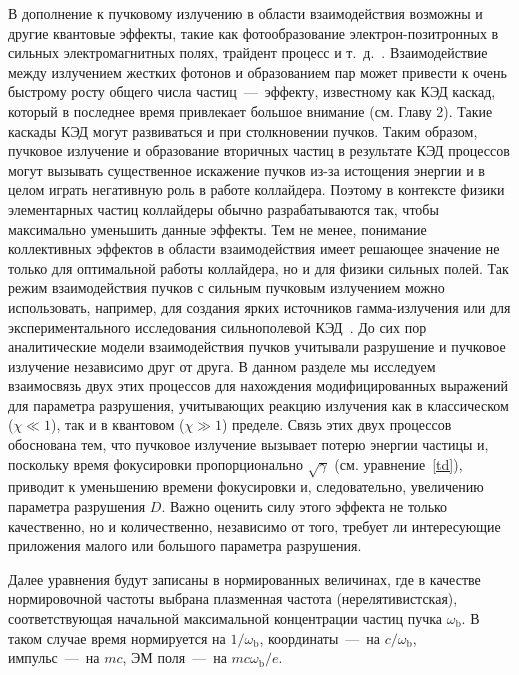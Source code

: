 В дополнение к пучковому излучению в области взаимодействия возможны и другие квантовые эффекты, такие как фотообразование электрон-позитронных в сильных электромагнитных полях, трайдент процесс и т. д.~\cite{chen1989coherent,hartin2018strong}.
Взаимодействие между излучением жестких фотонов и образованием пар может привести к очень быстрому росту общего числа частиц~---~эффекту, известному как КЭД каскад, который в последнее время привлекает большое внимание (см. Главу 2).
Такие каскады КЭД могут развиваться и при столкновении пучков.
Таким образом, пучковое излучение и образование вторичных частиц в результате КЭД процессов могут вызывать существенное искажение пучков из-за истощения энергии и в целом играть негативную роль в работе коллайдера.
Поэтому в контексте физики элементарных частиц коллайдеры обычно разрабатываются так, чтобы максимально уменьшить данные эффекты.
Тем не менее, понимание коллективных эффектов в области взаимодействия имеет решающее значение не только для оптимальной работы коллайдера, но и для физики сильных полей.
Так режим взаимодействия пучков с сильным пучковым излучением можно использовать, например, для создания ярких источников гамма-излучения или для экспериментального исследования сильнополевой КЭД~\cite{del2019bright,song2021generation,tamburini2020efficient}.
До сих пор аналитические модели взаимодействия пучков учитывали разрушение и пучковое излучение независимо друг от друга.
В данном разделе мы исследуем взаимосвязь двух этих процессов для нахождения модифицированных выражений для параметра разрушения, учитывающих реакцию излучения как в классическом ($\chi\ll1$), так и в квантовом ($ \chi\gg1$) пределе.
Связь этих двух процессов обоснована тем, что пучковое излучение вызывает потерю энергии частицы и, поскольку время фокусировки пропорционально $\sqrt{\gamma}$ (см. уравнение~\eqref{td}), приводит к уменьшению времени фокусировки и, следовательно, увеличению параметра разрушения $D$.
Важно оценить силу этого эффекта не только качественно, но и количественно, независимо от того, требует ли интересующие приложения малого или большого параметра разрушения.

Далее уравнения будут записаны в нормированных величинах, где в качестве нормировочной частоты выбрана плазменная частота (нерелятивистская), соответствующая начальной максимальной концентрации частиц пучка $\omega_\mathrm{b}$.
В таком случае время нормируется на $ 1/\omega_\mathrm{b}$, координаты~---~на $c/\omega_\mathrm{b}$, импульс~---~на $mc$, ЭМ поля~---~на $mc\omega_\mathrm{b}/e$.

